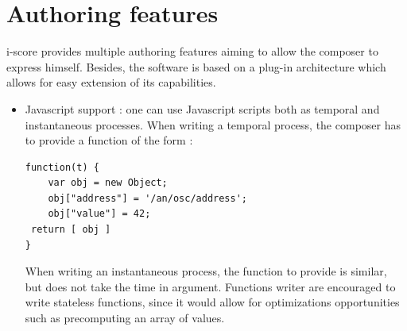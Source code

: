 \documentclass{article}
\begin{document}
\section{Authoring features}
i-score provides multiple authoring features aiming to allow 
the composer to express himself.
Besides, the software is based on a plug-in architecture which 
allows for easy extension of its capabilities.
\begin{itemize}
\item Javascript support : one can use Javascript scripts both as temporal and instantaneous processes.
When writing a temporal process, the composer has to provide a function of the form : 
\begin{lstlisting}
function(t) {      
    var obj = new Object; 
    obj["address"] = '/an/osc/address'; 
    obj["value"] = 42; 
 return [ obj ]
}
\end{lstlisting}
When writing an instantaneous process, the function to provide is similar, but does not take the time in argument.
Functions writer are encouraged to write stateless functions, since it would allow for optimizations opportunities such as precomputing an array of values.


\end{itemize}
\end{document}
